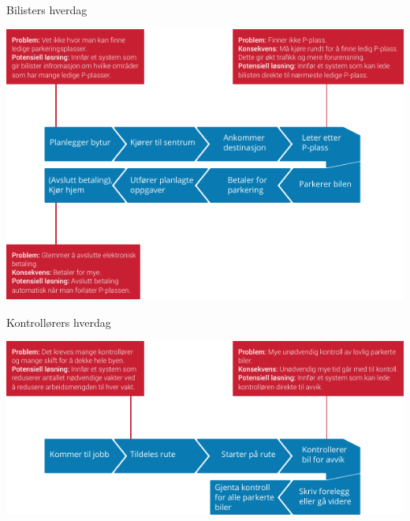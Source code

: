 \documentclass[xetex]{beamer}
\begin{document}
\begin{frame}\label{fr:bilisters_hverdag}
	\bigskip
	\centerline{{\large Bilisters hverdag}}
	\vspace{1.5em}
	\centerline{\includegraphics[]{grafikk/kundereiser/bilist_foer.pdf}}
\end{frame}










\begin{frame}\label{fr:kontrollorers_hverdag}
	\centerline{{\large Kontrollørers hverdag}}
	\vspace{2.5em}
	\centerline{\includegraphics[]{grafikk/kundereiser/kontrolloer_foer.pdf}}
\end{frame}
\end{document}
